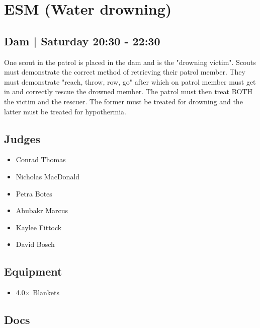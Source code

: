 \documentclass[10pt]{article}
\begin{document}
		\begin{minipage}{\linewidth}
		\setcounter{section}{24}
	\section{ESM (Water drowning) }
	\subsection*{Dam | Saturday 20:30 - 22:30}

	One scout in the patrol is placed in the dam and is the "drowning victim". Scouts must demonstrate the correct method of retrieving their patrol member. They must demonstrate "reach, throw, row, go" after which on patrol member must get in and correctly rescue the drowned member. The patrol must then treat BOTH the victim and the rescuer. The former must be treated for drowning and the latter must be treated for hypothermia.

	\begin{multicols}{2}
	\subsection*{\faUsers \: Judges}
	\begin{itemize}
			\item Conrad Thomas
			\item Nicholas MacDonald
			\item Petra Botes
			\item Abubakr Marcus
			\item Kaylee Fittock
			\item David Bosch
		\end{itemize}
	\columnbreak
	\subsection*{\faWrench \: Equipment}
	
        \begin{itemize}
                    \item 4.0$\times$ \: Blankets
                \end{itemize}
                \vfill\null
        \subsection*{\faFile \: Docs}
     	\end{multicols}


	\vspace{1cm}
	\end{minipage}
\end{document}
